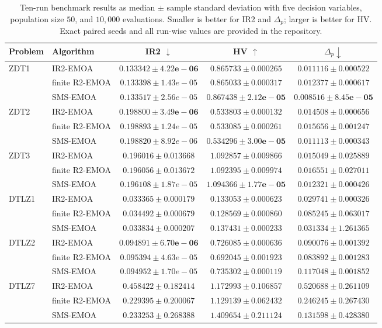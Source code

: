 \begin{table}[t]
\centering
\caption{Ten-run benchmark results as median $\pm$ sample standard deviation with five decision variables, population size $50$, and $10{,}000$ evaluations. Smaller is better for IR2 and $\Delta_p$; larger is better for HV. Exact paired seeds and all run-wise values are provided in the repository.}
\label{tab:benchmark10}
\scriptsize
\setlength{\tabcolsep}{2.5pt}
\begin{tabular}{llccc}
\toprule
Problem & Algorithm & IR2 $\downarrow$ & HV $\uparrow$ & $\Delta_p\downarrow$\\
\midrule
ZDT1 & IR2-EMOA & $\mathbf{0.133342\pm4.22e-06}$ & $0.865733\pm0.000265$ & $0.011116\pm0.000522$\\
 & finite R2-EMOA & $0.133398\pm1.43e-05$ & $0.865033\pm0.000317$ & $0.012377\pm0.000617$\\
 & SMS-EMOA & $0.133517\pm2.56e-05$ & $\mathbf{0.867438\pm2.12e-05}$ & $\mathbf{0.008516\pm8.45e-05}$\\
\addlinespace[1pt]
ZDT2 & IR2-EMOA & $\mathbf{0.198800\pm3.49e-06}$ & $0.533803\pm0.000132$ & $0.014508\pm0.000656$\\
 & finite R2-EMOA & $0.198893\pm1.24e-05$ & $0.533085\pm0.000261$ & $0.015656\pm0.001247$\\
 & SMS-EMOA & $0.198820\pm8.92e-06$ & $\mathbf{0.534296\pm3.00e-05}$ & $\mathbf{0.011113\pm0.000343}$\\
\addlinespace[1pt]
ZDT3 & IR2-EMOA & $\mathbf{0.196016\pm0.013668}$ & $1.092857\pm0.009866$ & $0.015049\pm0.025889$\\
 & finite R2-EMOA & $0.196056\pm0.013672$ & $1.092395\pm0.009974$ & $0.016551\pm0.027011$\\
 & SMS-EMOA & $0.196108\pm1.87e-05$ & $\mathbf{1.094366\pm1.77e-05}$ & $\mathbf{0.012321\pm0.000426}$\\
\addlinespace[1pt]
DTLZ1 & IR2-EMOA & $\mathbf{0.033365\pm0.000179}$ & $0.133053\pm0.000623$ & $\mathbf{0.029741\pm0.000326}$\\
 & finite R2-EMOA & $0.034492\pm0.000679$ & $0.128569\pm0.000860$ & $0.085245\pm0.063017$\\
 & SMS-EMOA & $0.033834\pm0.000207$ & $\mathbf{0.137431\pm0.000233}$ & $0.031334\pm1.261365$\\
\addlinespace[1pt]
DTLZ2 & IR2-EMOA & $\mathbf{0.094891\pm6.70e-06}$ & $0.726085\pm0.000636$ & $0.090076\pm0.001392$\\
 & finite R2-EMOA & $0.095394\pm4.63e-05$ & $0.692045\pm0.001923$ & $\mathbf{0.083892\pm0.001283}$\\
 & SMS-EMOA & $0.094952\pm1.70e-05$ & $\mathbf{0.735302\pm0.000119}$ & $0.117048\pm0.001852$\\
\addlinespace[1pt]
DTLZ7 & IR2-EMOA & $0.458422\pm0.182414$ & $1.172993\pm0.106857$ & $0.520688\pm0.261109$\\
 & finite R2-EMOA & $\mathbf{0.229395\pm0.200067}$ & $1.129139\pm0.062432$ & $0.246245\pm0.267430$\\
 & SMS-EMOA & $0.233253\pm0.268388$ & $\mathbf{1.409654\pm0.211124}$ & $\mathbf{0.131598\pm0.428380}$\\
\bottomrule
\end{tabular}
\end{table}
